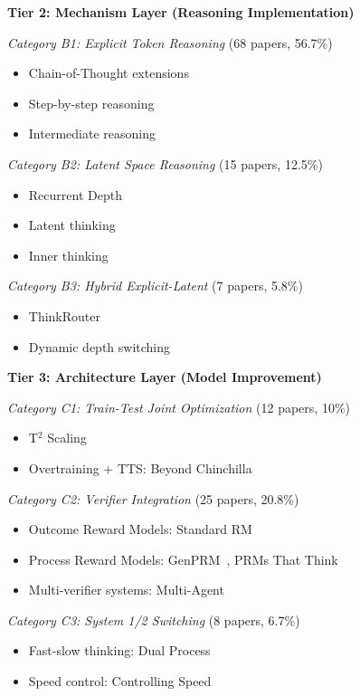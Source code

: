 \documentclass[10pt,preprint]{neurips_2024}
\begin{document}
\textbf{Tier 2: Mechanism Layer (Reasoning Implementation)}

\textit{Category B1: Explicit Token Reasoning} (68 papers, 56.7\%)
\begin{itemize}
    \item Chain-of-Thought extensions
    \item Step-by-step reasoning
    \item Intermediate reasoning
\end{itemize}

\textit{Category B2: Latent Space Reasoning} (15 papers, 12.5\%)
\begin{itemize}
    \item Recurrent Depth~\cite{recurrent2024}
    \item Latent thinking~\cite{latent2024}
    \item Inner thinking~\cite{inner2024}
\end{itemize}

\textit{Category B3: Hybrid Explicit-Latent} (7 papers, 5.8\%)
\begin{itemize}
    \item ThinkRouter~\cite{thinkrouter2024}
    \item Dynamic depth switching
\end{itemize}

\textbf{Tier 3: Architecture Layer (Model Improvement)}

\textit{Category C1: Train-Test Joint Optimization} (12 papers, 10\%)
\begin{itemize}
    \item T$^2$ Scaling~\cite{t22024}
    \item Overtraining + TTS: Beyond Chinchilla~\cite{chinchilla2024}
\end{itemize}

\textit{Category C2: Verifier Integration} (25 papers, 20.8\%)
\begin{itemize}
    \item Outcome Reward Models: Standard RM
    \item Process Reward Models: GenPRM~\cite{genprm2024}, PRMs That Think~\cite{prmthink2024}
    \item Multi-verifier systems: Multi-Agent~\cite{multiagent2024}
\end{itemize}

\textit{Category C3: System 1/2 Switching} (8 papers, 6.7\%)
\begin{itemize}
    \item Fast-slow thinking: Dual Process~\cite{dual2024}
    \item Speed control: Controlling Speed~\cite{speed2024}
\end{itemize}
\end{document}
